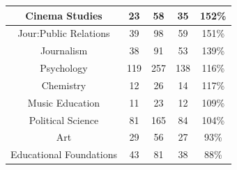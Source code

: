 \documentclass[10]{article}
\begin{document}
\begin{longtable}[c]{|ccccc|}
	\multicolumn{1}{|c|}{Cinema Studies}                             & \multicolumn{1}{c|}{23}                              & \multicolumn{1}{c|}{58}                                  & \multicolumn{1}{c|}{35}                 & 152\%                 \\ \hline
	\multicolumn{1}{|c|}{Jour:Public Relations}                      & \multicolumn{1}{c|}{39}                              & \multicolumn{1}{c|}{98}                                  & \multicolumn{1}{c|}{59}                 & 151\%                 \\ \hline
	\multicolumn{1}{|c|}{Journalism}                                 & \multicolumn{1}{c|}{38}                              & \multicolumn{1}{c|}{91}                                  & \multicolumn{1}{c|}{53}                 & 139\%                 \\ \hline
	\multicolumn{1}{|c|}{Psychology}                                 & \multicolumn{1}{c|}{119}                             & \multicolumn{1}{c|}{257}                                 & \multicolumn{1}{c|}{138}                & 116\%                 \\ \hline
	\multicolumn{1}{|c|}{Chemistry}                                  & \multicolumn{1}{c|}{12}                              & \multicolumn{1}{c|}{26}                                  & \multicolumn{1}{c|}{14}                 & 117\%                 \\ \hline
	\multicolumn{1}{|c|}{Music Education}                            & \multicolumn{1}{c|}{11}                              & \multicolumn{1}{c|}{23}                                  & \multicolumn{1}{c|}{12}                 & 109\%                 \\ \hline
	\multicolumn{1}{|c|}{Political Science}                          & \multicolumn{1}{c|}{81}                              & \multicolumn{1}{c|}{165}                                 & \multicolumn{1}{c|}{84}                 & 104\%                 \\ \hline
	\multicolumn{1}{|c|}{Art}                                        & \multicolumn{1}{c|}{29}                              & \multicolumn{1}{c|}{56}                                  & \multicolumn{1}{c|}{27}                 & 93\%                  \\ \hline
	\multicolumn{1}{|c|}{Educational Foundations}                    & \multicolumn{1}{c|}{43}                              & \multicolumn{1}{c|}{81}                                  & \multicolumn{1}{c|}{38}                 & 88\%                  \\ \hline

\end{longtable}
\end{document}
